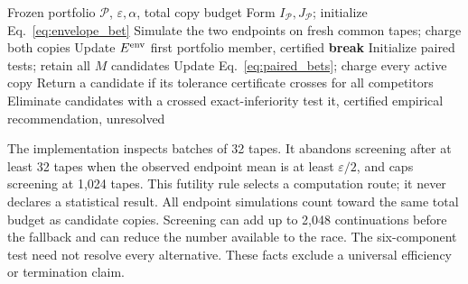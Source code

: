 \documentclass[preprint,11pt,sort&compress]{elsarticle}
\begin{document}
\begin{algorithm}[t]
\caption{Envelope-first certified portfolio selection}
\label{alg:envelope_first}
\begin{algorithmic}[1]
\Require Frozen portfolio $\mathcal P$, $\varepsilon,\alpha$, total copy budget
\State Form $I_{\mathcal P},J_{\mathcal P}$; initialize Eq.~\ref{eq:envelope_bet}
\State Simulate the two endpoints on fresh common tapes; charge both copies
\State Update $E^{\rm env}$
 \State \Return first portfolio member, certified \EndIf
{} \State \textbf{break} \EndIf
\EndWhile
\State Initialize paired tests; retain all $M$ candidates
\State Update Eq.~\ref{eq:paired_bets}; charge every active copy
\State Return a candidate if its tolerance certificate crosses for all competitors
\State Eliminate candidates with a crossed exact-inferiority test
 \State \Return it, certified \EndIf
\EndWhile
\State \Return empirical recommendation, unresolved
\end{algorithmic}
\end{algorithm}

The implementation inspects batches of 32 tapes. It abandons screening
after at least 32 tapes when the observed endpoint mean is at least
$\varepsilon/2$, and caps screening at 1,024 tapes. This futility rule
selects a computation route; it never declares a statistical result.
All endpoint simulations count toward the same total budget as candidate
copies. Screening can add up to 2,048 continuations before the fallback
and can reduce the number available to the race. The six-component test
need not resolve every alternative. These facts exclude a universal
efficiency or termination claim.
\end{document}
